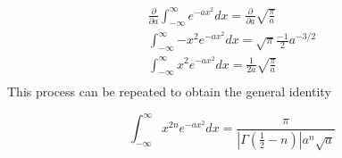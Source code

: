 \documentclass[a4paper]{article}
\numberwithin{equation}{subsection}
\begin{document}
\begin{gather*}
\frac{\partial}{\partial a} \int_{-\infty}^{\infty}{e^{-ax^2}}dx = \frac{\partial}{\partial a} \sqrt{\frac{\pi}{a}}  \\
\int_{-\infty}^{\infty}{-x^2 e^{-ax^2}}dx = \sqrt{\pi} \frac{-1}{2} a^{-3/2} \\
\boxed{
\int_{-\infty}^{\infty}{x^2 e^{-ax^2}}dx = \frac{1}{2a}  \sqrt{\frac{\pi}{a}}
}\\
\end{gather*}
This process can be repeated to obtain the general identity

\begin{equation}
\boxed{
\int_{-\infty}^{\infty}{x^{2n} e^{-ax^2}}dx = \frac{\pi}{|\Gamma(\tfrac{1}{2} - n)|a^n \sqrt{a}}}
\end{equation}
\end{document}
